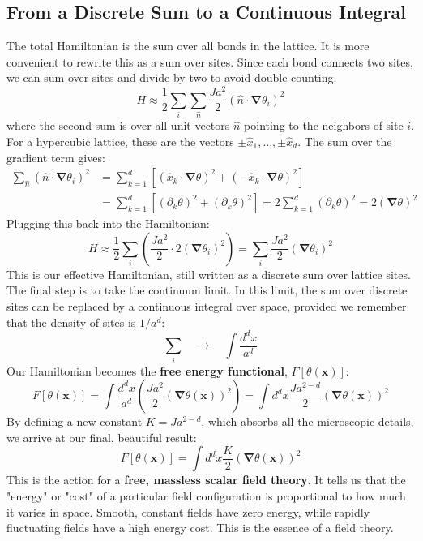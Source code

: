 \documentclass[11pt, a4paper, article]{article}
\renewcommand{\vec}[1]{\bm{#1}} %
\begin{document}
\subsection{From a Discrete Sum to a Continuous Integral}
The total Hamiltonian is the sum over all bonds in the lattice. It is more convenient to rewrite this as a sum over sites. Since each bond connects two sites, we can sum over sites and divide by two to avoid double counting.
\begin{equation}
    H \approx \frac{1}{2} \sum_i \sum_{\hat{n}} \frac{Ja^2}{2} (\hat{n} \cdot \vec{\nabla}\theta_i)^2
\end{equation}
where the second sum is over all unit vectors $\hat{n}$ pointing to the neighbors of site $i$. For a hypercubic lattice, these are the vectors $\pm \hat{x}_1, \dots, \pm \hat{x}_d$. The sum over the gradient term gives:
\begin{align}
    \sum_{\hat{n}} (\hat{n} \cdot \vec{\nabla}\theta_i)^2 &= \sum_{k=1}^d \left[ (\hat{x}_k \cdot \vec{\nabla}\theta)^2 + (-\hat{x}_k \cdot \vec{\nabla}\theta)^2 \right] \\
    &= \sum_{k=1}^d \left[ (\partial_k \theta)^2 + (\partial_k \theta)^2 \right] = 2 \sum_{k=1}^d (\partial_k \theta)^2 = 2 (\vec{\nabla}\theta)^2
\end{align}
Plugging this back into the Hamiltonian:
\begin{equation}
    H \approx \frac{1}{2} \sum_i \left( \frac{Ja^2}{2} \cdot 2(\vec{\nabla}\theta_i)^2 \right) = \sum_i \frac{Ja^2}{2} (\vec{\nabla}\theta_i)^2
\end{equation}
This is our effective Hamiltonian, still written as a discrete sum over lattice sites. The final step is to take the continuum limit. In this limit, the sum over discrete sites can be replaced by a continuous integral over space, provided we remember that the density of sites is $1/a^d$:
\begin{equation}
    \sum_i \quad \longrightarrow \quad \int \frac{d^d x}{a^d}
\end{equation}
Our Hamiltonian becomes the \textbf{free energy functional}, $F[\theta(\vec{x})]$:
\begin{equation}
    F[\theta(\vec{x})] = \int \frac{d^d x}{a^d} \left( \frac{Ja^2}{2} (\vec{\nabla}\theta(\vec{x}))^2 \right) = \int d^d x \frac{J a^{2-d}}{2} (\vec{\nabla}\theta(\vec{x}))^2
\end{equation}
By defining a new constant $K = J a^{2-d}$, which absorbs all the microscopic details, we arrive at our final, beautiful result:
\begin{equation}
    F[\theta(\vec{x})] = \int d^d x \frac{K}{2} (\vec{\nabla}\theta(\vec{x}))^2
    \label{eq:free_energy_final}
\end{equation}
This is the action for a \textbf{free, massless scalar field theory}. It tells us that the "energy" or "cost" of a particular field configuration is proportional to how much it varies in space. Smooth, constant fields have zero energy, while rapidly fluctuating fields have a high energy cost. This is the essence of a field theory.
\end{document}

